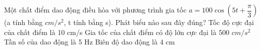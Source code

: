 \begin{vidu}%
Một chất điểm dao động điều hòa với phương trình gia tốc $a = 100\cos(5t + \dfrac{\pi}{3})$ (a tính bằng $ cm/s^2$, t tính bằng s). Phát biểu nào sau đây đúng?
\choice
{Tốc độ cực đại của chất điểm là 10 cm/s}
{Gia tốc của chất điểm có độ lớn cực đại là 500 $ cm/s^2$}
{Tần số của dao động là 5 Hz}
{\True Biên độ dao động là 4 cm}
\end{vidu} %